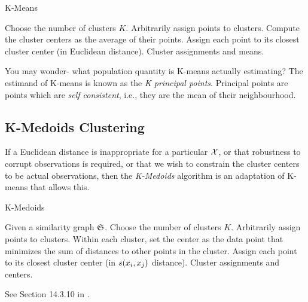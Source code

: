 \begin{algorithm}[H]
\caption{K-Means}
\label{algo:kmeans}
\begin{algorithmic}
\State Choose the number of clusters $K$.
\State Arbitrarily assign points to clusters.
	\State Compute the cluster centers as the average of their points.
	\State Assign each point to its closest cluster center (in Euclidean distance).
\EndWhile
\State \Return Cluster assignments and means.
\end{algorithmic}
\end{algorithm}


\begin{remark}
You may wonder- what population quantity is K-means actually estimating?
The estimand of K-means is known as the \emph{K principal points}.
Principal points are points which are \emph{self consistent}, i.e., they are the mean of their neighbourhood. 
\end{remark}




\subsection{K-Medoids Clustering}
\label{sec:k_medoids}



If a Euclidean distance is inappropriate for a particular $\mathcal{X}$, or that robustness to corrupt observations is required, or that we wish to constrain the cluster centers to be actual observations, then the \emph{K-Medoids} algorithm is an adaptation of K-means that allows this.

\begin{algorithm}[H]
\caption{K-Medoids}
\begin{algorithmic}
\State Given a similarity graph $\mathfrak{S}$.
\State Choose the number of clusters $K$.
\State Arbitrarily assign points to clusters.
	\State Within each cluster, set the center as the data point that minimizes the sum of distances to other points in the cluster.
	\State Assign each point to its closest cluster center (in $s(x_i,x_j)$ distance).
\EndWhile
\State \Return Cluster assignments and centers.
\end{algorithmic}
\end{algorithm}


See Section 14.3.10 in \cite{hastie_elements_2003}.








